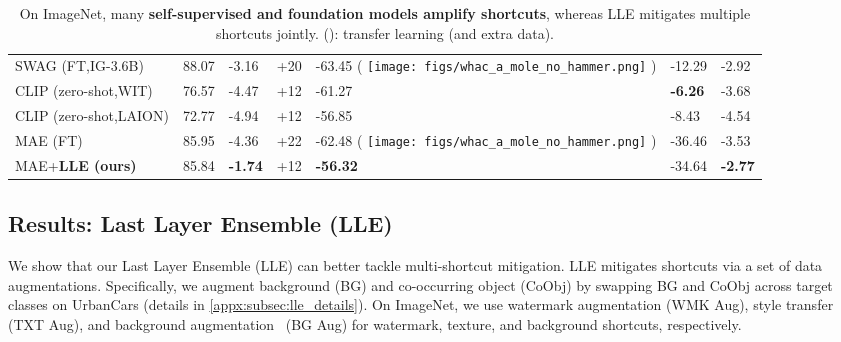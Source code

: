 \documentclass[10pt,twocolumn,letterpaper]{article}
\DeclareRobustCommand{\molenohammer}{\begingroup\normalfont
  \texttt{[image: figs/whac\_a\_mole\_no\_hammer.png]}\endgroup
}
\begin{document}
\begin{table}[t]
\begin{adjustbox}{width=\linewidth}
\begin{tabular}{@{}lllllll@{}}
SWAG \scriptsize{(FT,IG-3.6B)}         & 88.07         & -3.16           & +20          & -63.45 \scriptsize{(\textcolor{red}{} \molenohammer)}         & -12.29           & -2.92                 \\
CLIP \scriptsize{(zero-shot,WIT)}      & 76.57            & -4.47           & +12          & -61.27 & \textbf{-6.26}  & -3.68                          \\
CLIP \scriptsize{(zero-shot,LAION)}      & 72.77            & -4.94           & +12          & -56.85 & -8.43  & -4.54                          \\
MAE \scriptsize{(FT)}         & 85.95         & -4.36           & +22          & -62.48 \scriptsize{(\textcolor{red}{} \molenohammer)}         & -36.46          & -3.53                          \\
MAE+\textbf{LLE (ours)}       & 85.84                  & \textbf{-1.74}  & +12 & \textbf{-56.32} & -34.64 & \textbf{-2.77}                 \\
\bottomrule
\end{tabular}
\end{adjustbox}
\caption{On ImageNet, many \textbf{self-supervised and foundation models amplify shortcuts}, whereas LLE mitigates multiple shortcuts jointly. (): transfer learning (and extra data).
}
\label{tab:imagenet_results_larger_arch}
\vspace{-6mm}
\end{table}





\subsection{Results: Last Layer Ensemble (LLE)}
\label{subsec:lle_results}

We show that our Last Layer Ensemble (LLE) can better tackle multi-shortcut mitigation. LLE mitigates shortcuts via a set of data augmentations. Specifically,  we augment background (BG) and co-occurring object (CoObj) by swapping BG and CoObj across target classes on UrbanCars (details in \cref{appx:subsec:lle_details}). On ImageNet, we use watermark augmentation (WMK Aug), style transfer~\cite{geirhos2019Int.Conf.Learn.Represent.ImageNettrained} (TXT Aug), and background augmentation~\cite{xiao2021Int.Conf.Learn.Represent.Noise,ryali2021Characterizing} (BG Aug) for watermark, texture, and background shortcuts, respectively.
\end{document}
